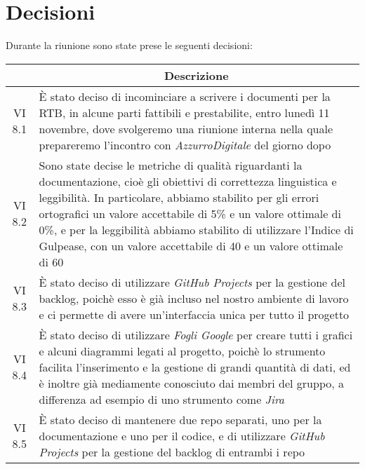 

\section{Decisioni}

Durante la riunione sono state prese le seguenti decisioni:

\vspace{0.5cm}

\begin{table}[htbp]
    \centering
    \begin{tabular}{|c|p{}|}
        \hline
        \rowcolor[gray]{0.75}
        \multicolumn{1}{|c|}{\textbf{Codice}} & \multicolumn{1}{|c|}{\textbf{Descrizione}}\\
        \hline
        VI 8.1 & È stato deciso di incominciare a scrivere i documenti per la RTB, in alcune parti fattibili e prestabilite, entro lunedì 11 novembre,
        dove svolgeremo una riunione interna nella quale prepareremo l'incontro con \emph{AzzurroDigitale} del giorno dopo \\
        \hline
        VI 8.2 & Sono state decise le metriche di qualità riguardanti la documentazione, cioè gli obiettivi di correttezza linguistica e leggibilità.
        In particolare, abbiamo stabilito per gli errori ortografici un valore accettabile di 5\% e un valore ottimale di 0\%, e per la leggibilità abbiamo
        stabilito di utilizzare l'Indice di Gulpease, con un valore accettabile di 40 e un valore ottimale di 60 \\
        \hline
        VI 8.3 & È stato deciso di utilizzare \emph{GitHub Projects} per la gestione del backlog, poichè esso è già incluso nel nostro ambiente di lavoro e ci
        permette di avere un'interfaccia unica per tutto il progetto \\
        \hline
        VI 8.4 & È stato deciso di utilizzare \emph{Fogli Google} per creare tutti i grafici e alcuni diagrammi legati al progetto, poichè lo strumento 
        facilita l'inserimento e la gestione di grandi quantità di dati, ed è inoltre già mediamente conosciuto dai membri del gruppo, a differenza ad 
        esempio di uno strumento come \emph{Jira} \\
        \hline
        VI 8.5 & È stato deciso di mantenere due repo separati, uno per la documentazione e uno per il codice, e di utilizzare \emph{GitHub Projects} per la
        gestione del backlog di entrambi i repo \\
        \hline
    \end{tabular}
    \end{table}
